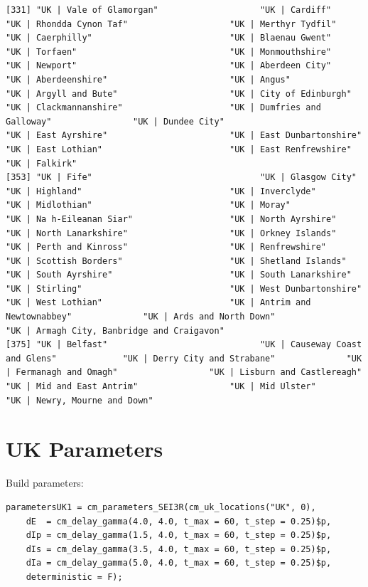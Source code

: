 \documentclass[11pt]{article}
\begin{document}
\begin{verbatim}
[331] "UK | Vale of Glamorgan"                    "UK | Cardiff"                              "UK | Rhondda Cynon Taf"                    "UK | Merthyr Tydfil"                       "UK | Caerphilly"                           "UK | Blaenau Gwent"                        "UK | Torfaen"                              "UK | Monmouthshire"                        "UK | Newport"                              "UK | Aberdeen City"                        "UK | Aberdeenshire"                        "UK | Angus"                                "UK | Argyll and Bute"                      "UK | City of Edinburgh"                    "UK | Clackmannanshire"                     "UK | Dumfries and Galloway"                "UK | Dundee City"                          "UK | East Ayrshire"                        "UK | East Dunbartonshire"                  "UK | East Lothian"                         "UK | East Renfrewshire"                    "UK | Falkirk"                             
[353] "UK | Fife"                                 "UK | Glasgow City"                         "UK | Highland"                             "UK | Inverclyde"                           "UK | Midlothian"                           "UK | Moray"                                "UK | Na h-Eileanan Siar"                   "UK | North Ayrshire"                       "UK | North Lanarkshire"                    "UK | Orkney Islands"                       "UK | Perth and Kinross"                    "UK | Renfrewshire"                         "UK | Scottish Borders"                     "UK | Shetland Islands"                     "UK | South Ayrshire"                       "UK | South Lanarkshire"                    "UK | Stirling"                             "UK | West Dunbartonshire"                  "UK | West Lothian"                         "UK | Antrim and Newtownabbey"              "UK | Ards and North Down"                  "UK | Armagh City, Banbridge and Craigavon"
[375] "UK | Belfast"                              "UK | Causeway Coast and Glens"             "UK | Derry City and Strabane"              "UK | Fermanagh and Omagh"                  "UK | Lisburn and Castlereagh"              "UK | Mid and East Antrim"                  "UK | Mid Ulster"                           "UK | Newry, Mourne and Down"
\end{verbatim}

\section{UK Parameters}
\label{sec:org7c7a62c}
Build parameters:
\begin{verbatim}
parametersUK1 = cm_parameters_SEI3R(cm_uk_locations("UK", 0),
    dE  = cm_delay_gamma(4.0, 4.0, t_max = 60, t_step = 0.25)$p,
    dIp = cm_delay_gamma(1.5, 4.0, t_max = 60, t_step = 0.25)$p,
    dIs = cm_delay_gamma(3.5, 4.0, t_max = 60, t_step = 0.25)$p,
    dIa = cm_delay_gamma(5.0, 4.0, t_max = 60, t_step = 0.25)$p,
    deterministic = F);
\end{verbatim}
\end{document}
